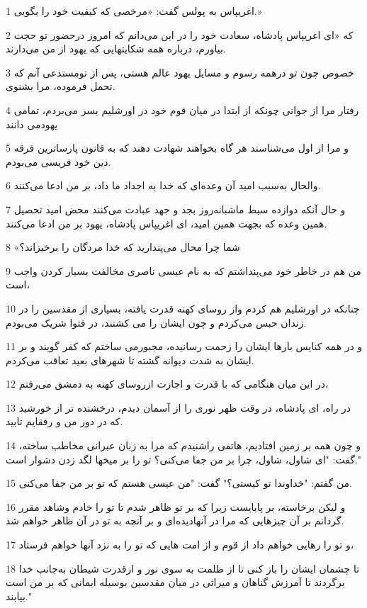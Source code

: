 \par 1 اغریپاس به پولس گفت: «مرخصی که کیفیت خود را بگویی.»
\par 2 که «ای اغریپاس پادشاه، سعادت خود را در این می‌دانم که امروز درحضور تو حجت بیاورم، درباره همه شکایتهایی که یهود از من می‌دارند.
\par 3 خصوص چون تو درهمه رسوم و مسایل یهود عالم هستی، پس از تومستدعی آنم که تحمل فرموده، مرا بشنوی.
\par 4 رفتار مرا از جوانی چونکه از ابتدا در میان قوم خود در اورشلیم بسر می‌بردم، تمامی یهودمی دانند
\par 5 و مرا از اول می‌شناسند هر گاه بخواهند شهادت دهند که به قانون پارساترین فرقه دین خود فریسی می‌بودم.
\par 6 والحال به‌سبب امید آن وعده‌ای که خدا به اجداد ما داد، بر من ادعا می‌کنند.
\par 7 و حال آنکه دوازده سبط ماشبانه‌روز بجد و جهد عبادت می‌کنند محض امید تحصیل همین وعده که بجهت همین امید، ای اغریپاس پادشاه، یهود بر من ادعا می‌کنند.
\par 8 «شما چرا محال می‌پندارید که خدا مردگان را برخیزاند؟
\par 9 من هم در خاطر خود می‌پنداشتم که به نام عیسی ناصری مخالفت بسیار کردن واجب است،
\par 10 چنانکه در اورشلیم هم کردم واز روسای کهنه قدرت یافته، بسیاری از مقدسین را در زندان حبس می‌کردم و چون ایشان را می کشتند، در فتوا شریک می‌بودم.
\par 11 و در همه کنایس بارها ایشان را زحمت رسانیده، مجبورمی ساختم که کفر گویند و بر ایشان به شدت دیوانه گشته تا شهرهای بعید تعاقب می‌کردم.
\par 12 در این میان هنگامی که با قدرت و اجازت ازروسای کهنه به دمشق می‌رفتم،
\par 13 در راه، ای پادشاه، در وقت ظهر نوری را از آسمان دیدم، درخشنده تر از خورشید که در دور من و رفقایم تابید.
\par 14 و چون همه بر زمین افتادیم، هاتفی راشنیدم که مرا به زبان عبرانی مخاطب ساخته، گفت: "ای شاول، شاول، چرا بر من جفا می‌کنی؟ تو را بر میخها لگد زدن دشوار است."
\par 15 من گفتم: "خداوندا تو کیستی؟" گفت: "من عیسی هستم که تو بر من جفا می‌کنی.
\par 16 و لیکن برخاسته، بر پابایست زیرا که بر تو ظاهر شدم تا تو را خادم وشاهد مقرر گردانم بر آن چیزهایی که مرا در آنهادیده‌ای و بر آنچه به تو در آن ظاهر خواهم شد.
\par 17 و تو را رهایی خواهم داد از قوم و از امت هایی که تو را به نزد آنها خواهم فرستاد،
\par 18 تا چشمان ایشان را باز کنی تا از ظلمت به سوی نور و ازقدرت شیطان به‌جانب خدا برگردند تا آمرزش گناهان و میراثی در میان مقدسین بوسیله ایمانی که بر من است بیابند."
